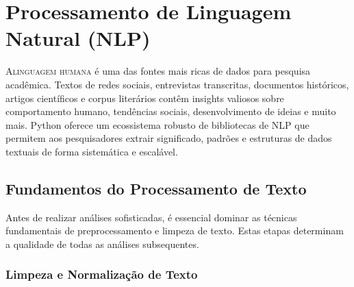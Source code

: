 
\chapter{Processamento de Linguagem Natural (NLP)}

\lettrine{A}{linguagem humana} é uma das fontes mais ricas de dados para pesquisa acadêmica. Textos de redes sociais, entrevistas transcritas, documentos históricos, artigos científicos e corpus literários contêm insights valiosos sobre comportamento humano, tendências sociais, desenvolvimento de ideias e muito mais. Python oferece um ecossistema robusto de bibliotecas de NLP que permitem aos pesquisadores extrair significado, padrões e estruturas de dados textuais de forma sistemática e escalável.

\section{Fundamentos do Processamento de Texto}

Antes de realizar análises sofisticadas, é essencial dominar as técnicas fundamentais de preprocessamento e limpeza de texto. Estas etapas determinam a qualidade de todas as análises subsequentes.

\subsection{Limpeza e Normalização de Texto}

